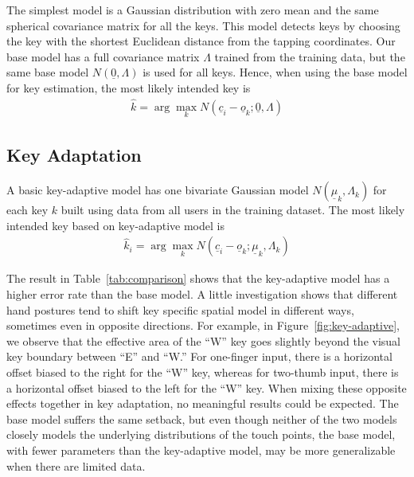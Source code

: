 \documentclass{sigchi}
\begin{document}
The simplest model is a Gaussian distribution with zero mean and the same spherical covariance matrix for all the keys. This model detects keys by choosing the key with the shortest Euclidean distance from the tapping coordinates. 
Our base model has a full covariance matrix $\Lambda$ trained from the
training data, but the same base model $N(\underline 0, \Lambda)$ is used for all keys. Hence, when using the base model for key estimation, the most likely intended key is
\begin{align}          
\hat k = \arg\max_k N(\underline c_i - \underline o_k; \underline 0, \Lambda)
\end{align}


\subsection{Key Adaptation}
A basic key-adaptive model has one bivariate Gaussian model
$N(\underline\mu_k, \Lambda_k)$ for each key $k$ built  using data from all users in the training dataset. The most likely intended key based on key-adaptive model is
\begin{align}          
\hat k_i = \arg\max_k N(\underline c_i - \underline o_k; \underline \mu_k, \Lambda_k)
\end{align}

The result in Table~\ref{tab:comparison} shows that the key-adaptive 
model has a higher error rate than the base model. A little investigation shows that different hand
postures tend to shift key specific spatial model in different ways, sometimes even in opposite
directions. For example, in Figure~\ref{fig:key-adaptive}, we observe that the
effective area of the ``W'' key goes slightly beyond the visual key boundary between ``E'' 
and ``W.'' For one-finger input, there is a horizontal offset biased to the
right for the ``W'' key, whereas for two-thumb input, there is a
horizontal offset biased to the left for the ``W'' key. When mixing these
opposite effects together in key adaptation, no meaningful results could be expected. The base model suffers the same setback, but even though neither
of the two models closely models the underlying distributions of the touch points, the base model, with fewer parameters than the key-adaptive model, may be more generalizable when there are limited data.
\end{document}
